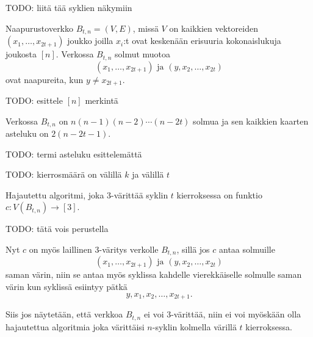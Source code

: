 \documentclass[finnish]{tktltiki2}
\theoremstyle{definition}
\theoremstyle{remark}
\begin{document}
TODO: liitä tää syklien näkymiin

Naapurustoverkko $B_{t,n} = (V,E)$, missä $V$ on kaikkien vektoreiden
$(x_1,\dots,x_{2t+1})$ joukko joilla $x_i$:t ovat keskenään erisuuria
kokonaislukuja joukosta $[n]$. Verkossa $B_{t,n}$ solmut muotoa
%
\begin{equation*}
    (x_1, \dots, x_{2t+1}) \text{ ja } (y,x_2,\dots,x_{2t})
\end{equation*}
%
ovat naapureita, kun $y \neq x_{2t+1}$.

TODO: esittele $[n]$ merkintä

Verkossa $B_{t,n}$ on $n(n-1)(n-2) \cdots (n-2t)$ solmua ja sen kaikkien
kaarten asteluku on $2(n-2t-1)$.

TODO: termi asteluku esittelemättä

TODO: kierrosmäärä on välillä $k$ ja välillä $t$

Hajautettu algoritmi, joka 3-värittää syklin
$t$ kierroksessa on funktio $c : V(B_{t,n}) \to [3]$.

TODO: tätä vois perustella

Nyt $c$ on myös laillinen 3-väritys verkolle $B_{t,n}$, sillä jos $c$ antaa
solmuille
%
\begin{equation*}
    (x_1, \dots, x_{2t+1}) \text{ ja } (y,x_2,\dots,x_{2t})
\end{equation*}
%
saman värin, niin se antaa myös syklissa kahdelle vierekkäiselle solmulle saman
värin kun syklissä esiintyy pätkä
%
\begin{equation*}
    y, x_1, x_2, \dots, x_{2t+1}.
\end{equation*}

Siis jos näytetään, että verkkoa $B_{t,n}$ ei voi 3-värittää, niin ei voi
myöskään olla hajautettua algoritmia joka värittäisi $n$-syklin kolmella
värillä $t$ kierroksessa.


%
%
% 
%



\end{document}
